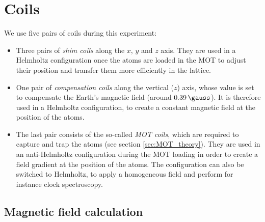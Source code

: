 \documentclass[11pt]{article}
\numberwithin{equation}{section}
\numberwithin{figure}{section}
\begin{document}
%
%
%

\newpage

\section{Coils}
\label{sec:coils}

We use five pairs of coils during this experiment:
\begin{itemize}
	\item Three pairs of \emph{shim coils} along the $x$, $y$ and $z$ axis. They are used in a Helmholtz configuration once the atoms are loaded in the MOT to adjust their position and transfer them more efficiently in the lattice. 
	\item One pair of \emph{compensation coils} along the vertical ($z$) axis, whose value is set to compensate the Earth's magnetic field (around $\SI{0.39}{\gauss}$). It is therefore used in a Helmholtz configuration, to create a constant magnetic field at the position of the atoms.
	\item The last pair consists of the so-called \emph{MOT coils}, which are required to capture and trap the atoms (see section \ref{sec:MOT_theory}). They are used in an anti-Helmholtz configuration during the MOT loading in order to create a field gradient at the position of the atoms. The configuration can also be switched to Helmholtz, to apply a homogeneous field and perform for instance clock spectroscopy.
\end{itemize} 

 \subsection{Magnetic field calculation}
\end{document}
